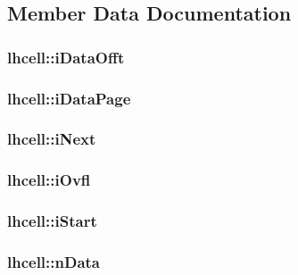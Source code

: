 \subsection{Member Data Documentation}
\hypertarget{structlhcell_a60c576e207171236463fc822811a70ee}{
\subsubsection[{i\-Data\-Offt}]{ lhcell\-::i\-Data\-Offt}}\label{d1/da5/structlhcell_a60c576e207171236463fc822811a70ee}
\hypertarget{structlhcell_af508ceea349890124e66d31d2e0381d9}{
\subsubsection[{i\-Data\-Page}]{ lhcell\-::i\-Data\-Page}}\label{d1/da5/structlhcell_af508ceea349890124e66d31d2e0381d9}
\hypertarget{structlhcell_adf5c5ea52f46d1f944fa1560c871ae8a}{
\subsubsection[{i\-Next}]{ lhcell\-::i\-Next}}\label{d1/da5/structlhcell_adf5c5ea52f46d1f944fa1560c871ae8a}
\hypertarget{structlhcell_ad0edd976a79c4282a1fb1ac0e3f8eb97}{
\subsubsection[{i\-Ovfl}]{ lhcell\-::i\-Ovfl}}\label{d1/da5/structlhcell_ad0edd976a79c4282a1fb1ac0e3f8eb97}
\hypertarget{structlhcell_a348e1a6f1f2a1fa7dd598372b4d68646}{
\subsubsection[{i\-Start}]{ lhcell\-::i\-Start}}\label{d1/da5/structlhcell_a348e1a6f1f2a1fa7dd598372b4d68646}
\hypertarget{structlhcell_a3fbad51e81a0a4ea44aae01e1fa2671e}{
\subsubsection[{n\-Data}]{ lhcell\-::n\-Data}}\label{d1/da5/structlhcell_a3fbad51e81a0a4ea44aae01e1fa2671e}
